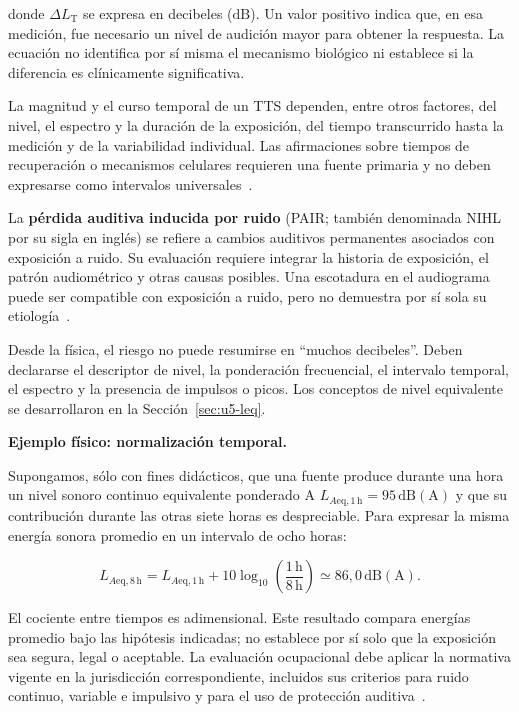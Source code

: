 donde \(\Delta L_{\mathrm{T}}\) se expresa en decibeles (\(\mathrm{dB}\)).
Un valor positivo indica que, en esa medición, fue necesario un nivel de
audición mayor para obtener la respuesta. La ecuación no identifica por sí
misma el mecanismo biológico ni establece si la diferencia es clínicamente
significativa.

La magnitud y el curso temporal de un TTS dependen, entre otros
factores, del nivel, el espectro y la duración de la exposición, del tiempo
transcurrido hasta la medición y de la variabilidad individual. Las
afirmaciones sobre tiempos de recuperación o mecanismos celulares requieren
una fuente primaria y no deben expresarse como intervalos universales~\cite{ryan2016}.

La \textbf{pérdida auditiva inducida por ruido} (PAIR; también denominada
NIHL por su sigla en inglés) se refiere a cambios auditivos permanentes
asociados con exposición a ruido. Su evaluación requiere integrar la
historia de exposición, el patrón audiométrico y otras causas posibles. Una
escotadura en el audiograma puede ser compatible con exposición a ruido, pero
no demuestra por sí sola su etiología~\cite{ryan2016,ashaHearingAdults}.

Desde la física, el riesgo no puede resumirse en ``muchos decibeles''. Deben
declararse el descriptor de nivel, la ponderación frecuencial, el intervalo
temporal, el espectro y la presencia de impulsos o picos. Los conceptos de
nivel equivalente se desarrollaron en la Sección~\ref{sec:u5-leq}.

\medskip
\noindent\textbf{Ejemplo físico: normalización temporal.}\par
Supongamos, sólo con fines didácticos, que una fuente produce durante una hora
un nivel sonoro continuo equivalente ponderado A
\(L_{A\mathrm{eq},1\,\mathrm{h}}=95\,\mathrm{dB(A)}\) y que su contribución durante las
otras siete horas es despreciable. Para expresar la misma energía sonora
promedio en un intervalo de ocho horas:

\begin{equation}
    L_{A\mathrm{eq},8\,\mathrm{h}}
    =
    L_{A\mathrm{eq},1\,\mathrm{h}}
    +10\log_{10}\left(\frac{1\,\mathrm{h}}{8\,\mathrm{h}}\right)
    \simeq 86{,}0\,\mathrm{dB(A)}.
    \label{eq:u8-leq-ejemplo}
\end{equation}

El cociente entre tiempos es adimensional. Este resultado compara energías
promedio bajo las hipótesis indicadas; no establece por sí solo que la
exposición sea segura, legal o aceptable. La evaluación ocupacional
debe aplicar la normativa vigente en la jurisdicción correspondiente,
incluidos sus criterios para ruido continuo, variable e impulsivo y para el
uso de protección auditiva~\cite{argentinaResolucion85,nioshNoise1998}.

